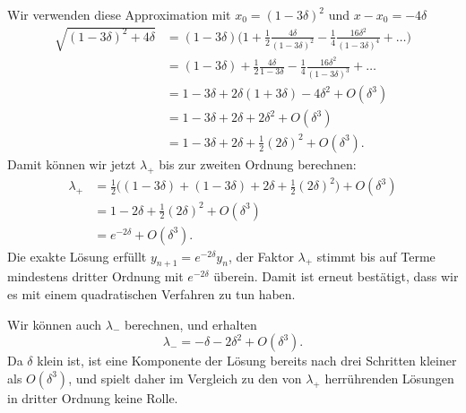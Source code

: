 Wir verwenden diese Approximation mit $x_0=(1-3\delta)^2$ und $x-x_0=-4\delta$
\begin{align*}
\sqrt{(1-3\delta)^2+4\delta}
&=
(1-3\delta)\biggl(1+\frac12\frac{4\delta}{(1-3\delta)^2}
-\frac14\frac{16\delta^2}{(1-3\delta)^4}+\dots\biggr)
\\
&=(1-3\delta)+\frac12\frac{4\delta}{1-3\delta}
-\frac14\frac{16\delta^2}{(1-3\delta)^3}+\dots
\\
&=1-3\delta+2\delta(1+3\delta)-4\delta^2+O(\delta^3)
\\
&=1-3\delta+2\delta + 2\delta^2+O(\delta^3)
\\
&=1-3\delta+2\delta + \frac12(2\delta)^2+O(\delta^3).
\end{align*}
Damit können wir jetzt $\lambda_+$ bis zur zweiten Ordnung berechnen:
\begin{align*}
\lambda_+
&=
\frac12\biggl((1-3\delta)+ (1-3\delta)+2\delta+\frac12(2\delta)^2\biggr)
+O(\delta^3)
\\
&=
1-2\delta+\frac12(2\delta)^2+O(\delta^3)
\\
&=e^{-2\delta}+O(\delta^3).
\end{align*}
Die exakte Lösung erfüllt $y_{n+1}=e^{-2\delta}y_n$, der Faktor
$\lambda_+$ stimmt bis auf Terme mindestens dritter Ordnung mit 
$e^{-2\delta}$ überein.
Damit ist erneut bestätigt, dass wir es mit einem quadratischen Verfahren zu
tun haben.

Wir können auch $\lambda_-$ berechnen, und erhalten
\[
\lambda_-=-\delta-2\delta^2+O(\delta^3).
\]
Da $\delta$ klein ist, ist eine Komponente der Lösung bereits nach
drei Schritten kleiner als $O(\delta^3)$, und spielt daher im Vergleich
zu den von $\lambda_+$ herrührenden Lösungen in dritter Ordnung keine
Rolle.

